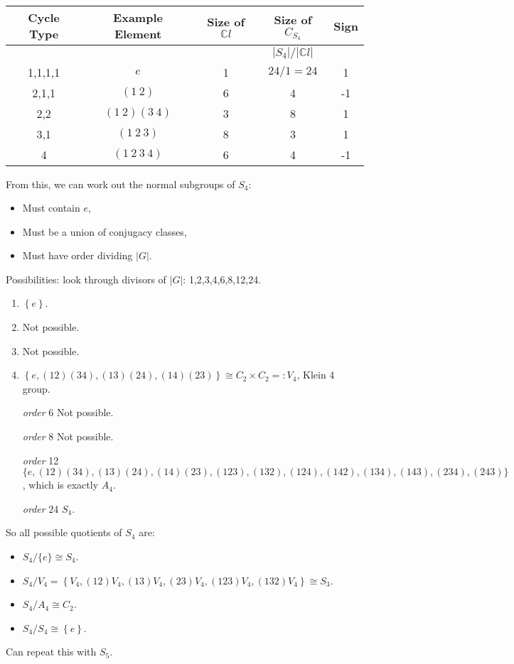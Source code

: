 \documentclass[a4paper]{article}
\newcommand{\redcomment}[1]{{\color{red}#1}}
\begin{document}
\begin{example}
  \begin{center}
    \begin{tabular}{c|c|c|c|c}
      Cycle Type & Example Element & Size of $\mathbb{C}l$ & Size of
      $C_{S_4}$ & Sign \\
      \hline
      & & & \redcomment{$ |S_4|/|\mathbb{C}l| $} & \\
      1,1,1,1 & $e$ & 1 & $24/1=24$ &1 \\
      2,1,1 & $(1\ 2)$ & 6 & 4 &-1 \\
      2,2 & $(1\ 2)(3\ 4)$ & 3 & 8 &1 \\
      3,1 & $(1\ 2\ 3)$ & 8 & 3 &1 \\
      4 & $(1\ 2\ 3\ 4)$ & 6 & 4 &-1 \\
    \end{tabular}
  \end{center}
  From this, we can work out the normal subgroups of $S_4$:
  \begin{itemize}
    \item Must contain $e$,
    \item Must be a union of conjugacy classes,
    \item Must have order dividing $|G|$.
  \end{itemize}
  Possibilities: look through divisors of $|G|$: 1,2,3,4,6,8,12,24.
  \begin{enumerate}[align=left, label=\textit{order} \arabic*]
    \item $ \left\{ e \right\} $.
    \item Not possible.
    \item Not possible.
    \item $ \left\{ e,(12)(34),(13)(24),(14)(23) \right\} \cong C_2
      \times C_2=:V_4 $, Klein 4 group.
    \item[\textit{order} 6] Not possible.
    \item[\textit{order} 8] Not possible.
    \item[\textit{order} 12] $ \{e,(12)(34),(13)(24),(14)(23), (123),
      (132),(124),(142),(134),(143),(234),(243)\}$, which is exactly $A_4$.
    \item[\textit{order} 24] $S_4$.
  \end{enumerate}
  So all possible quotients of $S_4$ are:
  \begin{itemize}
    \item $ S_4/\{e\}\cong S_4 $.
    \item $ S_4/V_4 = \left\{
      V_4,(12)V_4,(13)V_4,(23)V_4,(123)V_4,(132)V_4 \right\} \cong S_3 $.
    \item $ S_4/A_4 \cong C_2 $.
    \item $ S_4/S_4 \cong \left\{ e \right\} $.
  \end{itemize}
  Can repeat this with $S_5$.
\end{example}
\end{document}
